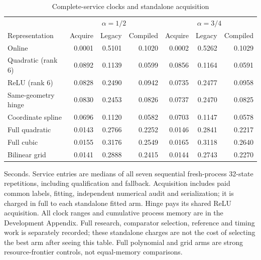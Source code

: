 \begin{table}[htbp]\caption{Complete-service clocks and standalone acquisition}\label{tab:clocks109}
\centering\small
\begin{tabular}{@{}lrrrrrr@{}}\toprule
&\multicolumn{3}{c}{$\alpha=1/2$}&\multicolumn{3}{c}{$\alpha=3/4$}\\
Representation&Acquire&Legacy&Compiled&Acquire&Legacy&Compiled\\\midrule
Online & 0.0001 & 0.5101 & 0.1020 & 0.0002 & 0.5262 & 0.1029\\
Quadratic (rank 6) & 0.0892 & 0.1139 & 0.0599 & 0.0856 & 0.1164 & 0.0591\\
ReLU (rank 6) & 0.0828 & 0.2490 & 0.0942 & 0.0735 & 0.2477 & 0.0958\\
Same-geometry hinge & 0.0830 & 0.2453 & 0.0826 & 0.0737 & 0.2470 & 0.0825\\
Coordinate spline & 0.0696 & 0.1120 & 0.0582 & 0.0703 & 0.1147 & 0.0578\\
Full quadratic & 0.0143 & 0.2766 & 0.2252 & 0.0146 & 0.2841 & 0.2217\\
Full cubic & 0.0155 & 0.3176 & 0.2549 & 0.0165 & 0.3118 & 0.2640\\
Bilinear grid & 0.0141 & 0.2888 & 0.2415 & 0.0144 & 0.2743 & 0.2270\\
\bottomrule\end{tabular}
\par\smallskip\begin{minipage}{.98\linewidth}\footnotesize
Seconds. Service entries are medians of all seven sequential fresh-process 32-state repetitions, including qualification and fallback. Acquisition includes paid common labels, fitting, independent numerical audit and serialization; it is charged in full to each standalone fitted arm. Hinge pays its shared ReLU acquisition. All clock ranges and cumulative process memory are in the Development Appendix. Full research, comparator selection, reference and timing work is separately recorded; these standalone charges are not the cost of selecting the best arm after seeing this table. Full polynomial and grid arms are strong resource-frontier controls, not equal-memory comparisons.
\end{minipage}\end{table}
